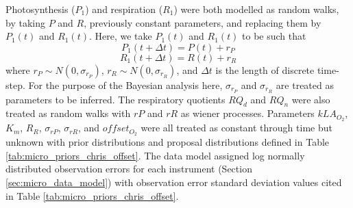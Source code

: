 \documentclass{ruthesis}
\begin{document}
Photosynthesis ($P_1$) and respiration ($R_1$) were both modelled as random walks, by taking \begin{math}P\end{math} and \begin{math}R\end{math}, previously constant parameters, and replacing them by \begin{math}P_1(t)\end{math} and \begin{math}R_1(t)\end{math}. Here, we take \begin{math}P_1(t)\end{math} and \begin{math}R_1(t)\end{math} to be such that
\begin{displaymath}
P_1(t+\Delta t) = P(t) + r_P
\end{displaymath}
\begin{displaymath}
R_1(t+\Delta t) = R(t) + r_R
\end{displaymath}
where \begin{math}
r_P \sim N(0, \sigma_{r_P})
\end{math}, \begin{math}
r_R \sim N(0, \sigma_{r_R})
\end{math}, and \begin{math}
\Delta t
\end{math} is the length of discrete time-step. For the purpose of the Bayesian analysis here, \begin{math}\sigma_{r_P}\end{math} and \begin{math}\sigma_{r_R}\end{math} are treated as parameters to be inferred.  
The respiratory quotients $RQ_d$ and $RQ_n$ were also treated as random walks with $rP$ and $rR$ as wiener processes. 
Parameters $kLA_{O_2}$, $K_m$, $R_R$, $\sigma_{rP}$, $\sigma_{rR}$, and $offset_{O_2}$ were all treated as constant through time but unknown with prior distributions and proposal distributions defined in Table \ref{tab:micro_priors_chris_offset}.
The data model assigned log normally distributed observation errors for each instrument (Section \ref{sec:micro_data_model}) with observation error standard deviation values cited in Table \ref{tab:micro_priors_chris_offset}.
\end{document}
